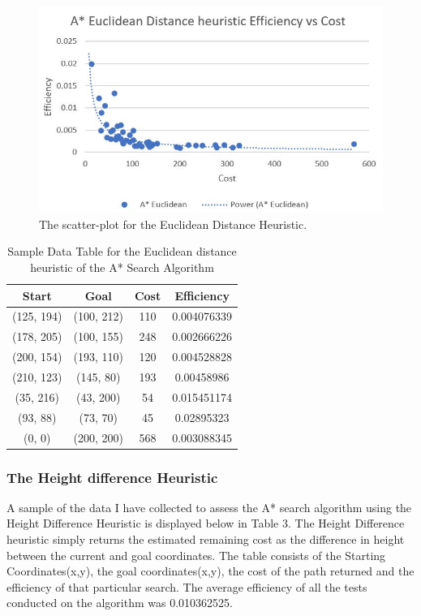\documentclass[11pt,oneside]{article}
\begin{document}
\begin{figure}[H]
    \centering
      \includegraphics[scale=0.8]{ED efficiency vs cost.JPG}
      \caption{The scatter-plot for the Euclidean Distance Heuristic.}
      \label{fig:EDEvC}
    \end{figure} 
    
    \begin{table}[H]
    \centering
    \begin{tabular}{|c|c|c|c|}
        Start        & Goal       & Cost & Efficiency \\ \hline
        (125, 194)   & (100, 212) & 110 & 0.004076339 \\
        (178, 205)   & (100, 155) & 248 & 0.002666226 \\
        (200, 154)   & (193, 110) & 120 & 0.004528828 \\
        (210, 123)   & (145, 80)  & 193 & 0.00458986 \\
        (35, 216)    & (43, 200)  & 54 & 0.015451174 \\
        (93, 88)     & (73, 70)   & 45 & 0.02895323 \\
        (0, 0)       & (200, 200) & 568 & 0.003088345 \\
    \end{tabular}
    \caption{Sample Data Table for the Euclidean distance heuristic of the A* Search Algorithm}
    \label{tab:my_label}
\end{table}

\subsubsection{The Height difference Heuristic}
A sample of the data I have collected to assess the A* search algorithm using the Height Difference Heuristic is displayed below in Table 3. The Height Difference heuristic simply returns the estimated remaining cost as the difference in height between the current and goal coordinates. The table consists of the Starting Coordinates(x,y), the goal coordinates(x,y), the cost of the path returned and the efficiency of that particular search. The average efficiency of all the tests conducted on the algorithm was 0.010362525. 
\end{document}

